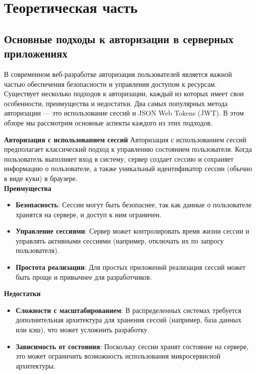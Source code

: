 \chapter{Теоретическая часть}

\section{Основные подходы к авторизации в серверных приложениях}

В современном веб-разработке авторизация пользователей является важной частью обеспечения безопасности и управления доступом к ресурсам. Существует несколько подходов к авторизации, каждый из которых имеет свои особенности, преимущества и недостатки. Два самых популярных метода авторизации — это использование сессий и JSON Web Tokens (JWT). В этом обзоре мы рассмотрим основные аспекты каждого из этих подходов.


\textbf{Авторизация с использованием сессий}
Авторизация с использованием сессий предполагает классический подход к управлению состоянием пользователя. 
Когда пользователь выполняет вход в систему, сервер создает сессию и сохраняет информацию о пользователе, 
а также уникальный идентификатор сессии (обычно в виде куки) в браузере.\\
\textbf{Преимущества}
\begin{itemize}
    \item \textbf{Безопасность}: Сессии могут быть безопаснее, так как данные о пользователе хранятся на сервере, и доступ к ним ограничен.
    \item \textbf{Управление сессиями}: Сервер может контролировать время жизни сессии и управлять активными сессиями (например, отключать их по запросу пользователя).
    \item \textbf{Простота реализации}: Для простых приложений реализация сессий может быть проще и привычнее для разработчиков.
\end{itemize}

\textbf{Недостатки}
\begin{itemize}
    \item \textbf{Сложности с масштабированием}: В распределенных системах требуется дополнительная архитектура для хранения сессий (например, база данных или кэш), что может усложнить разработку.
    \item \textbf{Зависимость от состояния}: Поскольку сессии хранят состояние на сервере, это может ограничить возможность использования микросервисной архитектуры.
\end{itemize}



